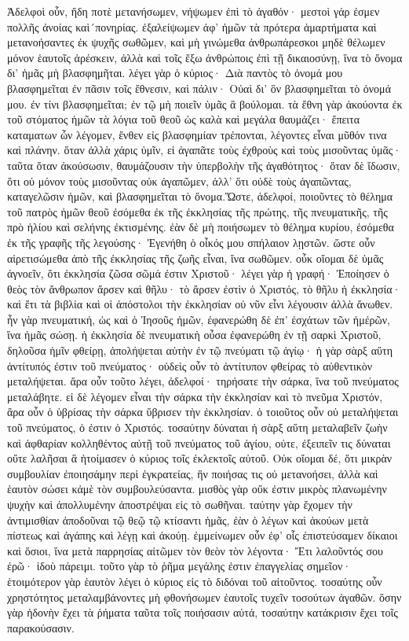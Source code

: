 Ἀδελφοὶ οὖν, ἤδη ποτὲ μετανήσωμεν, νήψωμεν ἐπὶ τὸ ἀγαθόν· μεστοὶ γάρ ἐσμεν πολλῆς ἀνοίας καὶ´πονηρίας. ἐξαλείψωμεν ἀφ’ ἡμῶν τὰ πρότερα ἁμαρτήματα καὶ μετανοήσαντες ἐκ ψυχῆς σωθῶμεν, καὶ μὴ γινώμεθα ἀνθρωπάρεσκοι μηδὲ θέλωμεν μόνον ἑαυτοῖς ἀρέσκειν, ἀλλὰ καὶ τοῖς ἔξω ἀνθρώποις ἐπὶ τῇ δικαιοσύνῃ, ἵνα τὸ ὄνομα δι’ ἡμᾶς μὴ βλασφημῆται. λέγει γὰρ ὁ κύριος· Διὰ παντὸς τὸ ὀνομά μου βλασφημεῖται ἐν πᾶσιν τοῖς ἔθνεσιν, καὶ πάλιν· Οὐαὶ δι’ ὃν βλασφημεῖται τὸ ὀνομά μου. ἐν τίνι βλασφημεῖται; ἐν τῷ μὴ ποιεῖν ὑμᾶς ἃ βούλομαι. τὰ ἔθνη γὰρ ἀκούοντα ἐκ τοῦ στόματος ἡμῶν τὰ λόγια τοῦ θεοῦ ὡς καλὰ καὶ μεγάλα θαυμάζει· ἔπειτα καταματων ὧν λέγομεν, ἔνθεν εἰς βλασφημίαν τρέπονται, λέγοντες εἶναι μῦθόν τινα καὶ πλάνην. ὅταν ἀλλὰ χάρις ὑμῖν, εἰ ἀγαπᾶτε τοὺς ἐχθροὺς καὶ τοὺς μισοῦντας ὑμᾶς· ταῦτα ὅταν ἀκούσωσιν, θαυμάζουσιν τὴν ὑπερβολὴν τῆς ἀγαθότητος· ὅταν δὲ ἴδωσιν, ὅτι οὐ μόνον τοὺς μισοῦντας οὐκ ἀγαπῶμεν, ἀλλ’ ὅτι οὐδὲ τοὺς ἀγαπῶντας, καταγελῶσιν ἡμῶν, καὶ βλασφημεῖται τὸ ὄνομα.Ὥστε, ἀδελφοί, ποιοῦντες τὸ θέλημα τοῦ πατρὸς ἡμῶν θεοῦ ἐσόμεθα ἐκ τῆς ἐκκλησίας τῆς πρώτης, τῆς πνευματικῆς, τῆς πρὸ ἡλίου καὶ σελήνης ἐκτισμένης. ἐὰν δὲ μὴ ποιήσωμεν τὸ θέλημα κυρίου, ἐσόμεθα ἐκ τῆς γραφῆς τῆς λεγούσης· Ἐγενήθη ὁ οἶκός μου σπήλαιον λῃστῶν. ὥστε οὖν αἱρετισώμεθα ἀπὸ τῆς ἐκκλησίας τῆς ζωῆς εἶναι, ἵνα σωθῶμεν. οὖκ οἴομαι δὲ ὑμᾶς ἀγνοεῖν, ὅτι ἐκκλησία ζῶσα σῶμά ἐστιν Χριστοῦ· λέγει γὰρ ἡ γραφή· Ἐποίησεν ὁ θεὸς τὸν ἄνθρωπον ἄρσεν καὶ θῆλυ· τὸ ἄρσεν ἐστὶν ὁ Χριστός, τὸ θῆλυ ἡ ἐκκλησία· καὶ ἔτι τὰ βιβλία καὶ οἱ ἀπόστολοι τὴν ἐκκλησίαν οὐ νῦν εἶνι λέγουσιν ἀλλὰ ἄνωθεν. ἦν γὰρ πνευματική, ὡς καὶ ὁ Ἰησοῦς ἡμῶν, ἐφανερώθη δὲ ἐπ’ ἐσχάτων τῶν ἡμέρῶν, ἵνα ἡμᾶς σώσῃ. ἡ ἐκκλησία δὲ πνευματικὴ οὖσα ἐφανερώθη ἐν τῇ σαρκὶ Χριστοῦ, δηλοῦσα ἡμῖν φθείρῃ, ἀπολήψεται αὐτὴν ἐν τῷ πνεύματι τῷ ἁγίῳ· ἡ γὰρ σὰρξ αὕτη ἀντίτυπός ἐστιν τοῦ πνεύματος· οὐδεὶς οὖν τὸ ἀντίτυπον φθείρας τὸ αὐθεντικὸν μεταλήψεται. ἄρα οὖν τοῦτο λέγει, ἀδελφοί· τηρήσατε τὴν σάρκα, ἵνα τοῦ πνεύματος μεταλάβητε. εἰ δὲ λέγομεν εἶναι τὴν σάρκα τὴν ἐκκλησίαν καὶ τὸ πνεῦμα Χριστόν, ἄρα οὖν ὁ ὑβρίσας τὴν σάρκα ὕβρισεν τὴν ἐκκλησίαν. ὁ τοιοῦτος οὖν οὐ μεταλήψεται τοῦ πνεύματος, ὁ ἐστιν ὁ Χριστός. τοσαύτην δύναται ἡ σὰρξ αὕτη μεταλαβεῖν ζωὴν καὶ ἀφθαρίαν κολληθέντος αὐτῇ τοῦ πνεύματος τοῦ ἁγίου, οὐτε, ἐξειπεῖν τις δύναται οὔτε λαλῆσαι ἃ ἡτοίμασεν ὁ κύριος τοῖς ἐκλεκτοῖς αὐτοῦ. 
Οὐκ οἴομαι δέ, ὅτι μικρὰν συμβουλίαν ἐποιησάμην περὶ ἐγκρατείας, ἣν ποιήσας τις οὐ μετανοήσει, ἀλλὰ καὶ ἑαυτὸν σώσει κἀμὲ τὸν συμβουλεύσαντα. μισθὸς γὰρ οὔκ ἐστιν μικρὸς πλανωμένην ψυχὴν καὶ ἀπολλυμένην ἀποστρέψαι εἰς τὸ σωθῆναι. ταύτην γὰρ ἔχομεν τὴν ἀντιμισθίαν ἀποδοῦναι τῷ θεῷ τῷ κτίσαντι ἡμᾶς, ἐὰν ὁ λέγων καὶ ἀκούων μετὰ πίστεως καὶ ἀγάπης καὶ λέγῃ καὶ ἀκούῃ. ἐμμείνωμεν οὖν ἐφ’ οἷς ἐπιστεύσαμεν δίκαιοι καὶ ὅσιοι, ἵνα μετὰ παρρησίας αἰτῶμεν τὸν θεὸν τὸν λέγοντα· Ἔτι λαλοῦντός σου ἐρῶ· ἰδοὺ πάρειμι. τοῦτο γὰρ τὸ ῥῆμα μεγάλης ἐστιν ἐπαγγελίας σημεῖον· ἑτοιμότερον γὰρ ἑαυτὸν λέγει ὁ κύριος εἰς τὸ διδόναι τοῦ αἰτοῦντος. τοσαύτης οὖν χρηστότητος μεταλαμβάνοντες μὴ φθονήσωμεν ἑαυτοῖς τυχεῖν τοσούτων ἀγαθῶν. ὅσην γὰρ ἡδονὴν ἔχει τὰ ῥήματα ταῦτα τοῖς ποιήσασιν αὐτά, τοσαύτην κατάκρισιν ἔχει τοῖς παρακούσασιν.
